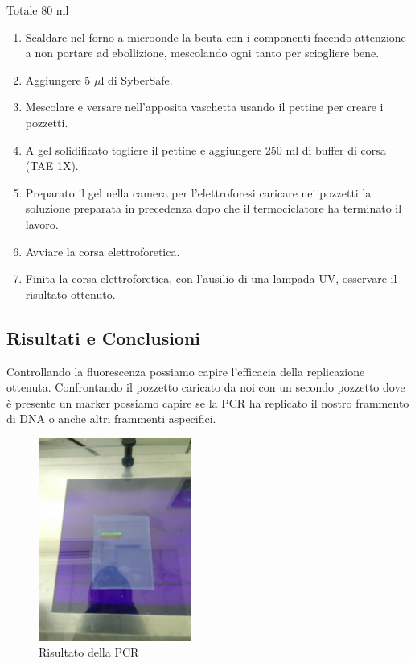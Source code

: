 Totale 80 ml
\begin{enumerate}
\item Scaldare nel forno a microonde la beuta con i componenti facendo attenzione a
non portare ad ebollizione, mescolando ogni tanto per sciogliere bene.
\item Aggiungere 5 $\mu$l di SyberSafe.
\item Mescolare e versare nell’apposita vaschetta
usando il pettine per creare i pozzetti.
\item A gel solidificato togliere il pettine e
aggiungere 250 ml di buffer di corsa (TAE 1X).

\item Preparato il gel nella camera per l’elettroforesi caricare nei pozzetti la
soluzione preparata in precedenza dopo che il termociclatore ha terminato il
lavoro.
\item Avviare la corsa elettroforetica.

\item Finita la corsa elettroforetica, con l’ausilio di una lampada UV, osservare il
risultato ottenuto.

\end{enumerate}


\subsection{Risultati e Conclusioni}

Controllando la fluorescenza possiamo capire l'efficacia della replicazione
ottenuta. Confrontando il pozzetto caricato da noi con un secondo pozzetto
dove è presente un marker possiamo capire se la PCR ha replicato il nostro
frammento di DNA o anche altri frammenti aspecifici.

\begin{figure}[htbp]
	\includegraphics[width=50mm]{./immagini/risultato_pcr.jpg}
	\caption{Risultato della PCR}
	\label{risultato_pcr}
\end{figure}
